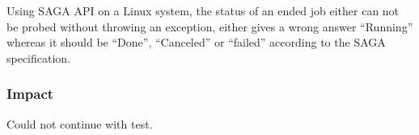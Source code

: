 Using SAGA API on a Linux system, the status of an ended job either can not be
probed without throwing an exception, either gives a wrong answer
``Running'' whereas it should be ``Done'', ``Canceled'' or ``failed''
according to the SAGA specification.

\subsubsection{Impact}
Could not continue with test. 